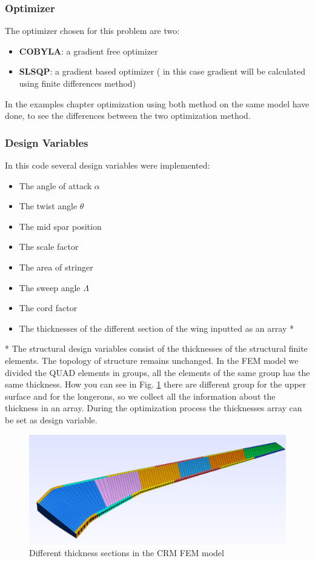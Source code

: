 \subsubsection{Optimizer}
The optimizer chosen for this problem are two:
\begin{itemize}
	\item \textbf{COBYLA}: a gradient free optimizer
	\item \textbf{SLSQP}: a gradient based optimizer ( in this case gradient will be calculated using finite differences method)
\end{itemize}
In the examples chapter optimization using both method on the same model have done, to see the differences between the two optimization method.
\subsubsection{Design Variables}
In this code several design variables were implemented:
\renewcommand{\labelitemi}{--}
\begin{itemize}
\item The angle of attack $\alpha$
\item The twist angle $\theta$
\item The mid spar position
\item The scale factor
\item The area of stringer
\item The sweep angle $\Lambda$
\item The cord factor
\item The thicknesses of the different section of the wing inputted as an array *
\end{itemize}
* The structural design variables consist of the thicknesses of the structural finite elements. The topology of structure remains unchanged. In the FEM model we divided the QUAD elements in groups, all the elements of the same group has the same thickness. How you can see in Fig. \ref{fig:2_5} there are different group for the upper surface and for the longerons, so we collect all the information about the thickness in an array. During the optimization process the thicknesses array can be set as design variable.
\begin{figure}[H]
	\centering
	\includegraphics[width = 1\textwidth]{./Immagini/2_5.png}
	\caption{Different thickness sections in the CRM FEM model}
	\label{fig:2_5}
\end{figure}

